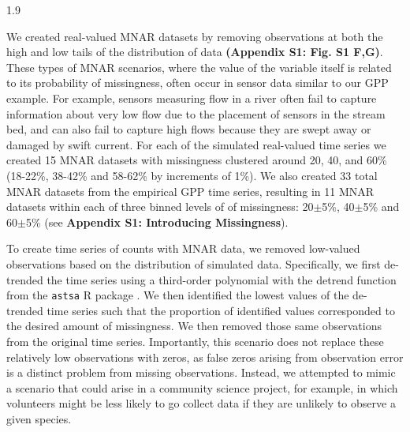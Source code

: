 \documentclass[12pt,english]{article} %
\begin{document}
\begin{linenumbers}
\begin{spacing}{1.9}
\begin{flushleft}
\hspace{1em} We created real-valued MNAR datasets by removing observations at both the high and low tails of the distribution of data \textbf{(Appendix S1: Fig. S1 F,G)}. These types of MNAR scenarios, where the value of the variable itself is related to its probability of missingness, often occur in sensor data similar to our GPP example. For example, sensors measuring flow in a river often fail to capture information about very low flow due to the placement of sensors in the stream bed, and can also fail to capture high flows because they are swept away or damaged by swift current. For each of the simulated real-valued time series we created 15 MNAR datasets with missingness clustered around 20, 40, and 60\% (18-22\%, 38-42\% and 58-62\% by increments of 1\%). We also created 33 total MNAR datasets from the empirical GPP time series, resulting in 11 MNAR datasets within each of three binned levels of of missingness: 20$\pm$5\%, 40$\pm$5\% and 60$\pm$5\% (see \textbf{Appendix S1: Introducing Missingness}). 
             
\hspace{1em} To create time series of counts with MNAR data, we removed low-valued observations based on the distribution of simulated data. Specifically, we first de-trended the time series 
using a third-order polynomial with the detrend function from the \texttt{astsa} R package \citep{astsaPackage}. We then identified the lowest values of the de-trended time series such that the proportion of identified values corresponded to the desired amount of missingness. We then removed those same observations from the original time series. Importantly, this scenario does not replace these relatively low observations with zeros, as false zeros arising from observation error is a distinct problem from missing observations. Instead, we attempted to mimic a scenario that could arise in a community science project, for example, in which volunteers might be less likely to go collect data if they are unlikely to observe a given species.


\end{flushleft}
\end{spacing}
\end{linenumbers}
\end{document}

